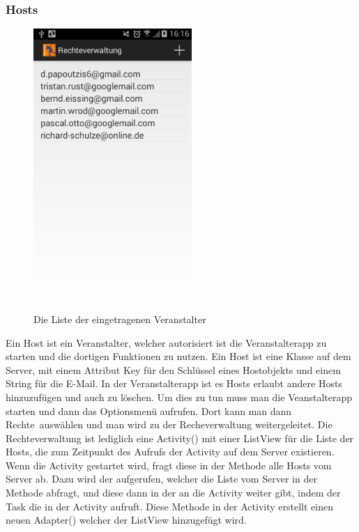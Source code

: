 \FloatBarrier
\subsubsection{Hosts}

\begin{figure}[htb]
\centering
\includegraphics[width=6cm]{graphics/Hosts.png}
\caption{Die Liste der eingetragenen Veranstalter}
\label{fig:hosts}
\end{figure}

Ein Host ist ein Veranstalter, welcher autorisiert ist die Veranstalterapp zu starten und die dortigen Funktionen zu nutzen. Ein Host ist eine Klasse auf dem Server, mit einem Attribut Key für den Schlüssel eines Hostobjekts und einem String für die E-Mail. In der Veranstalterapp ist es Hosts erlaubt andere Hosts hinzuzufügen und auch zu löschen. Um dies zu tun muss man die Veanstalterapp starten und dann das Optionsmenü aufrufen. Dort kann man dann \glqq Rechte\grqq\ auswählen und man wird zu der Recheverwaltung weitergeleitet. Die Rechteverwaltung ist lediglich eine Activity() mit einer ListView für die Liste der Hosts, die zum Zeitpunkt des Aufrufs der Activity auf dem Server existieren. Wenn die Activity gestartet wird, fragt diese in der  Methode alle Hosts vom Server ab. Dazu wird der  aufgerufen, welcher die Liste vom Server in der  Methode abfragt, und diese dann in der  an die Activity weiter gibt, indem der Task die  in der Activity aufruft. Diese Methode in der Activity erstellt einen neuen Adapter() welcher der ListView hinzugefügt wird.\\
\FloatBarrier

